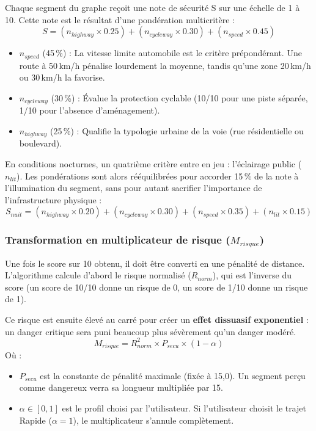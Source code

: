 Chaque segment du graphe reçoit une note de sécurité S sur une échelle de 1 à 10. Cette note est le résultat d'une pondération multicritère :
\begin{equation}
S = (n_{highway} \times 0.25) + (n_{cycleway} \times 0.30) + (n_{speed} \times 0.45)
\end{equation}
\begin{itemize}
    \item $n_{speed}$ (45\,\%) : La vitesse limite automobile est le critère prépondérant. Une route à 50\,km/h pénalise lourdement la moyenne, tandis qu'une zone 20\,km/h ou 30\,km/h la favorise.
    \item $n_{cycleway}$ (30\,\%) : Évalue la protection cyclable (10/10 pour une piste séparée, 1/10 pour l'absence d'aménagement).
    \item $n_{highway}$ (25\,\%) : Qualifie la typologie urbaine de la voie (rue résidentielle ou boulevard).
\end{itemize}

En conditions nocturnes, un quatrième critère entre en jeu : l'éclairage public ($n_{lit}$). 
Les pondérations sont alors rééquilibrées pour accorder 15\,\% de la note à l'illumination du segment, sans pour autant sacrifier l'importance de l'infrastructure physique :
\begin{equation}
    S_{nuit} = (n_{highway} \times 0.20) + (n_{cycleway} \times 0.30) + (n_{speed} \times 0.35) + (n_{lit} \times 0.15)
\end{equation}

\subsubsection{Transformation en multiplicateur de risque ($M_{risque}$)}
Une fois le score sur 10 obtenu, il doit être converti en une pénalité de distance. 
L'algorithme calcule d'abord le risque normalisé ($R_{norm}$), qui est l'inverse du score (un score de 10/10 donne un risque de 0, un score de 1/10 donne un risque de 1).

Ce risque est ensuite élevé au carré pour créer un \textbf{effet dissuasif exponentiel} : un danger critique sera puni beaucoup plus sévèrement qu'un danger modéré.
\begin{equation}
    M_{risque} = R_{norm}^2 \times P_{secu} \times (1 - \alpha)
\end{equation}
Où :
\begin{itemize}
    \item $P_{secu}$ est la constante de pénalité maximale (fixée à 15,0). Un segment perçu comme dangereux verra sa longueur multipliée par 15.
    \item $\alpha \in [0, 1]$ est le profil choisi par l'utilisateur. Si l'utilisateur choisit le trajet Rapide ($\alpha = 1$), le multiplicateur s'annule complètement.
\end{itemize}

